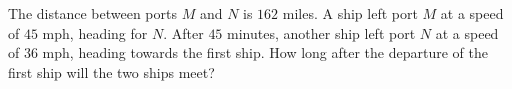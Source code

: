 The distance between ports $M$ and $N$ is $162$ miles. A ship left port $M$ at a speed of $45$ mph, heading for $N$. After $45$ minutes, another ship left port $N$ at a speed of $36$ mph, heading towards the first ship. How long after the departure of the first ship will the two ships meet?
